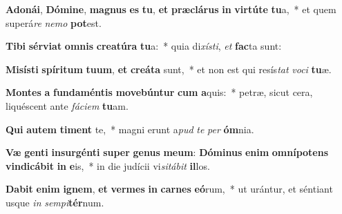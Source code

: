 \item \textbf{A}\textbf{do}\textbf{ná}\textbf{i}, \textbf{Dó}\textbf{mi}\textbf{ne}, \textbf{ma}\textbf{gnus} \textbf{es} \textbf{tu}, \textbf{et} \textbf{præ}\textbf{clá}\textbf{rus} \textbf{in} \textbf{vir}\textbf{tú}\textbf{te} \textbf{tu}a,~* et quem superá\textit{re} \textit{ne}\textit{mo} \textbf{pot}est.
\item \textbf{Ti}\textbf{bi} \textbf{sér}\textbf{vi}\textbf{at} \textbf{om}\textbf{nis} \textbf{cre}\textbf{a}\textbf{tú}\textbf{ra} \textbf{tu}a:~* quia di\textit{xís}\textit{ti}, \textit{et} \textbf{fac}ta sunt:
\item \textbf{Mi}\textbf{sís}\textbf{ti} \textbf{spí}\textbf{ri}\textbf{tum} \textbf{tu}\textbf{um}, \textbf{et} \textbf{cre}\textbf{á}\textbf{ta} sunt,~* et non est qui resís\textit{tat} \textit{vo}\textit{ci} \textbf{tu}æ.
\item \textbf{Mon}\textbf{tes} \textbf{a} \textbf{fun}\textbf{da}\textbf{mén}\textbf{tis} \textbf{mo}\textbf{ve}\textbf{bún}\textbf{tur} \textbf{cum} \textbf{a}quis:~* petræ, sicut cera, liquéscent ante \textit{fá}\textit{ci}\textit{em} \textbf{tu}am.
\item \textbf{Qui} \textbf{au}\textbf{tem} \textbf{ti}\textbf{ment} te,~* magni erunt a\textit{pud} \textit{te} \textit{per} \textbf{óm}nia.
\item \textbf{Væ} \textbf{gen}\textbf{ti} \textbf{in}\textbf{sur}\textbf{gén}\textbf{ti} \textbf{su}\textbf{per} \textbf{ge}\textbf{nus} \textbf{me}\textbf{um}: \textbf{Dó}\textbf{mi}\textbf{nus} \textbf{e}\textbf{nim} \textbf{om}\textbf{ní}\textbf{pot}\textbf{ens} \textbf{vin}\textbf{di}\textbf{cá}\textbf{bit} \textbf{in} \textbf{e}is,~* in die judícii vi\textit{si}\textit{tá}\textit{bit} \textbf{il}los.
\item \textbf{Da}\textbf{bit} \textbf{e}\textbf{nim} \textbf{i}\textbf{gnem}, \textbf{et} \textbf{ver}\textbf{mes} \textbf{in} \textbf{car}\textbf{nes} \textbf{e}\textbf{ó}rum,~* ut urántur, et séntiant usque \textit{in} \textit{sem}\textit{pi}\textbf{tér}num.
